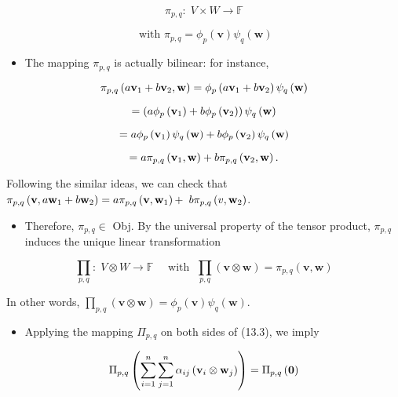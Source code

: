 \documentclass[11pt]{article}
\begin{document}
\[
{\pi }_{p,q} : \;V \times  W \rightarrow  \mathbb{F}
\]

\[
\text{ with }{\pi }_{p,q} = {\phi }_{p}\left( \mathbf{v}\right) {\psi }_{q}\left( \mathbf{w}\right)
\]

\begin{itemize}
\item The mapping \({\pi }_{p,q}\) is actually bilinear: for instance,
\end{itemize}

\[
{\pi }_{p,q}\left( {a{\bf v}_1 + b{\bf v}_2,\mathbf{w}}\right)  = {\phi }_{p}\left( {a{\bf v}_1 + b{\bf v}_2}\right) {\psi }_{q}\left( \mathbf{w}\right)
\]

\[
= \left( {a{\phi }_{p}\left( {\bf v}_1\right)  + b{\phi }_{p}\left( {\bf v}_2\right) }\right) {\psi }_{q}\left( \mathbf{w}\right)
\]

\[
= a{\phi }_{p}\left( {\bf v}_1\right) {\psi }_{q}\left( \mathbf{w}\right)  + b{\phi }_{p}\left( {\bf v}_2\right) {\psi }_{q}\left( \mathbf{w}\right)
\]

\[
= a{\pi }_{p,q}\left( {{\bf v}_1,\mathbf{w}}\right)  + b{\pi }_{p,q}\left( {{\bf v}_2,\mathbf{w}}\right) .
\]

Following the similar ideas, we can check that \({\pi }_{p,q}\left( {\mathbf{v},a{\bf w}_1 + b{\bf w}_2}\right)  = a{\pi }_{p,q}\left( {\mathbf{v},{\bf w}_1}\right)  +\)  \(b{\pi }_{p,q}\left( {v,{\bf w}_2}\right)\).

\begin{itemize}
\item Therefore, \({\pi }_{p,q} \in\) Obj. By the universal property of the tensor product, \({\pi }_{p,q}\) induces the unique linear transformation
\end{itemize}
\[
\mathop{\prod }\limits_{{p,q}} : \;V \otimes  W \rightarrow  \mathbb{F}
\quad \text{ with }\;\mathop{\prod }\limits_{{p,q}}\left( {\mathbf{v} \otimes  \mathbf{w}}\right)  = {\pi }_{p,q}\left( {\mathbf{v},\mathbf{w}}\right)
\]

In other words, \(\mathop{\prod }\limits_{{p,q}}\left( {\mathbf{v} \otimes  \mathbf{w}}\right)  = {\phi }_{p}\left( \mathbf{v}\right) {\psi }_{q}\left( \mathbf{w}\right)\).

\begin{itemize}
\item Applying the mapping \({\Pi }_{p,q}\) on both sides of (13.3), we imply
\end{itemize}

\[
{\Pi }_{p,q}\left( {\mathop{\sum }\limits_{{i = 1}}^n\mathop{\sum }\limits_{{j = 1}}^n\alpha_{ij}\left( {{\bf v}_{i} \otimes  {\bf w}_{j}}\right) }\right)  = {\Pi }_{p,q}\left( \mathbf{0}\right)
\]
\end{document}

